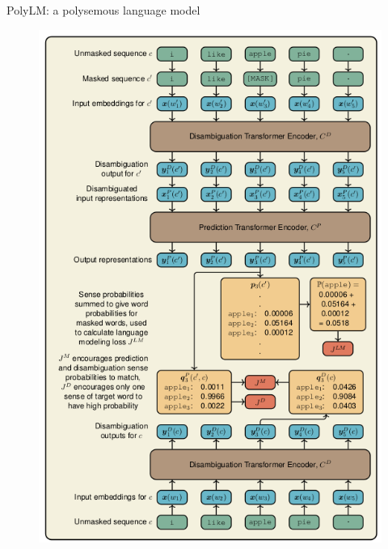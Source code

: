 \documentclass[handout]{beamer}
\begin{document}
\begin{frame}{PolyLM: a polysemous language model}

  \begin{figure}[h]
        	\includegraphics[scale = 0.25]{pics/polylm.png}
        \end{figure}


\end{frame}
\end{document}
